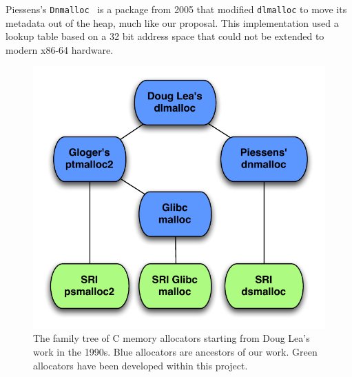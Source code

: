 \documentclass[twoside,12pt]{cslreport}
\begin{document}
Piessens's \texttt{Dnmalloc}~\cite{YJP06} is a package from 2005 that modified
\texttt{dlmalloc} to move its metadata out of the heap, much like our
proposal. This implementation used a lookup table based on a 32 bit address
space that could not be extended to modern x86-64 hardware.


\begin{figure}[h]
\begin{center}
\includegraphics{OurFamilyTree.pdf}
\end{center}
\caption[The family tree of C memory allocators.]{The family tree of C
  memory allocators starting from Doug Lea's work in the 1990s. Blue
  allocators are ancestors of our work.  Green allocators have been
  developed within this project.}
\label{fig:tree}
\end{figure}
\end{document}
